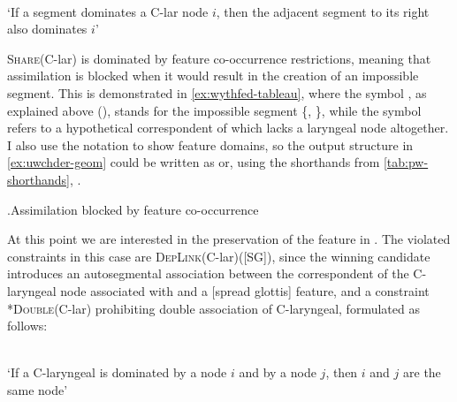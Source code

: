 \begin{constraint}
  \label{def:share}
  \\
`If a segment dominates a C-lar node $i$, then the adjacent segment to its right also dominates $i$'
\end{constraint}

\textsc{Share}(C-lar) is dominated by feature co-occurrence restrictions, meaning that assimilation is blocked when it would result in the creation of an impossible segment. This is demonstrated in \cref{ex:wythfed-tableau}, where the symbol \ipa{[vʰ]}, as explained above (), stands for the impossible segment \{, \}, while the symbol \ipa{[θ̥]} refers to a hypothetical correspondent of \ipa{[θ]} which lacks a laryngeal node altogether. I also use the notation  to show feature domains, so the output structure in \cref{ex:uwchder-geom} could be written as  or, using the shorthands from \cref{tab:pw-shorthands}, \ipa{[iu\fd{χt}{h}er]}.

\ex.\label{ex:wythfed-tableau}Assimilation blocked by feature co-occurrence\\
\begin{OTtableau}{3}
\end{OTtableau}

At this point we are interested in the preservation of the  feature in \ipa{[ˈiuχter]}. The violated constraints in this case are \textsc{DepLink}(C-lar)([SG]), since the winning candidate introduces an autosegmental association between the correspondent of the C-laryngeal node associated with \ipa{[d]} and a [spread glottis] feature, and a constraint \textsc{*Double}(C-lar) prohibiting double association of C-laryngeal, formulated as follows:

\begin{constraint}
  \label{def:star-double}
  \\
  `If a C-laryngeal is dominated by a node $i$ and by a node $j$, then $i$ and $j$ are the same node'
\end{constraint}

